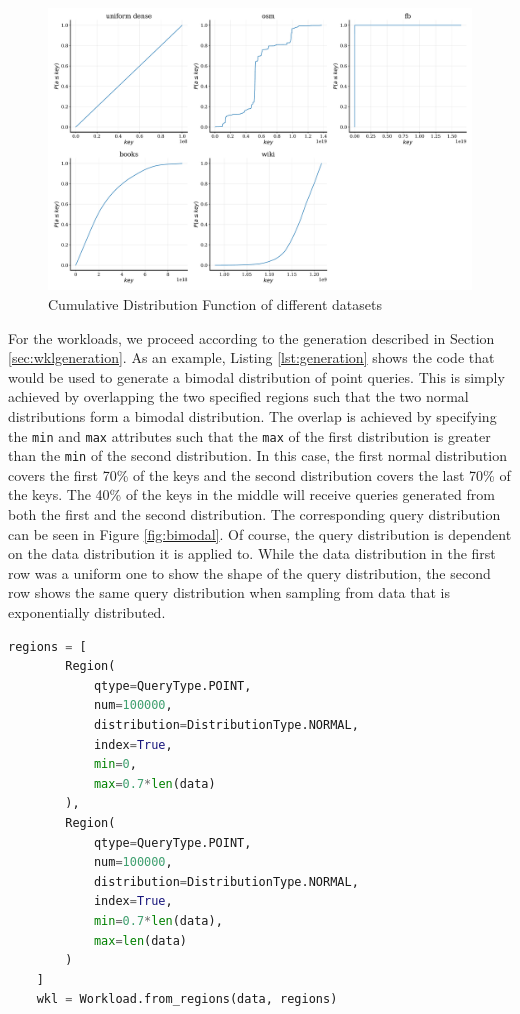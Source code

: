 \begin{figure}
    \centering
    \includegraphics[width=\textwidth]{figures/cdfs.pdf}
    \caption{Cumulative Distribution Function of different datasets}
    \label{fig:cdfs}
\end{figure}

For the workloads, we proceed according to the generation described in Section \ref{sec:wklgeneration}. As an example, Listing \ref{lst:generation} shows the code that would be used to generate a bimodal distribution of point queries. This is simply achieved by overlapping the two specified regions such that the two normal distributions form a bimodal distribution. The overlap is achieved by specifying the \verb|min| and \verb|max| attributes such that the \verb|max| of the first distribution is greater than the \verb|min| of the second distribution. In this case, the first normal distribution covers the first 70\% of the keys and the second distribution covers the last 70\% of the keys. The 40\% of the keys in the middle will receive queries generated from both the first and the second distribution. The corresponding query distribution can be seen in Figure \ref{fig:bimodal}. Of course, the query distribution is dependent on the data distribution it is applied to. While the data distribution in the first row was a uniform one to show the shape of the query distribution, the second row shows the same query distribution when sampling from data that is exponentially distributed.

\begin{lstlisting}[language=Python, caption=Example workload generation from Region objects, label=lst:generation]
    regions = [
        Region(
            qtype=QueryType.POINT, 
            num=100000, 
            distribution=DistributionType.NORMAL, 
            index=True, 
            min=0, 
            max=0.7*len(data)
        ),
        Region(
            qtype=QueryType.POINT, 
            num=100000, 
            distribution=DistributionType.NORMAL, 
            index=True, 
            min=0.7*len(data), 
            max=len(data)
        )
    ]
    wkl = Workload.from_regions(data, regions)
\end{lstlisting}

